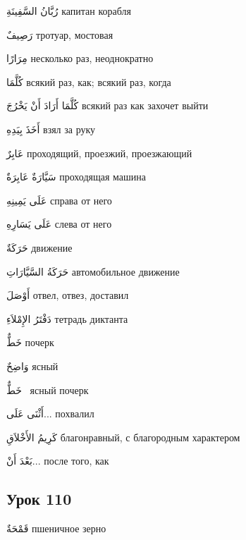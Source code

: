 \documentclass[a5paper]{article}
\newcommand\textstyleDropCaps[1]{#1}
\newcommand\textstyleCaptioncharacters[1]{#1}
\begin{document}
\textstyleCaptioncharacters{رُبَّانُ السَّفِينَةِ }\textstyleDropCaps{капитан корабля‎}

\textstyleCaptioncharacters{رَصِيفٌ }\textstyleDropCaps{тротуар, мостовая‎}

\textstyleCaptioncharacters{مِرَارًا }\textstyleDropCaps{несколько раз, неод­нократно‎}

\textstyleCaptioncharacters{كُلَّمَا }\textstyleDropCaps{всякий раз, как; вся­кий раз, когда‎}

\textstyleCaptioncharacters{كُلَّمَا أَرَادَ أَنْ يَخْرُجَ }\textstyleDropCaps{всякий раз как захочет выйти ‎}

\textstyleCaptioncharacters{أَخَذَ بِيَدِهِ }\textstyleDropCaps{взял за руку‎}

\textstyleCaptioncharacters{عَابِرٌ }\textstyleDropCaps{проходящий, проез­жий, проезжающий‎}

\textstyleCaptioncharacters{سَيَّارَةٌ عَابِرَةٌ }\textstyleDropCaps{проходя­щая машина‎}

\textstyleCaptioncharacters{عَلَى يَمِينِهِ }\textstyleDropCaps{справа от него‎}

\textstyleCaptioncharacters{عَلَى يَسَارِهِ }\textstyleDropCaps{слева от него‎}

\textstyleCaptioncharacters{حَرَكَةٌ }\textstyleDropCaps{движение‎}

\textstyleCaptioncharacters{حَرَكَةُ السَّيَّارَاتِ }\textstyleDropCaps{авто­мобильное движение‎}

\textstyleCaptioncharacters{أَوْصَلَ }\textstyleDropCaps{отвел, отвез, доста­вил‎}

\textstyleCaptioncharacters{دَفْتَرُ الإِمْلاَءِ }\textstyleDropCaps{тетрадь диктанта‎}

\textstyleCaptioncharacters{خَطٌّ }\textstyleDropCaps{почерк‎}

\textstyleCaptioncharacters{وَاضِحٌ }\textstyleDropCaps{ясный‎}

\textstyleCaptioncharacters{خَطٌّ \ }\textstyleDropCaps{ясный почерк‎}

\textstyleCaptioncharacters{أَثْنَى عَلَى... }\textstyleDropCaps{похвалил‎}

\textstyleCaptioncharacters{كَرِيمُ الأَخْلاَقِ }\textstyleDropCaps{благо­нравный, с благородным характером‎}

\textstyleCaptioncharacters{بَعْدَ أَنْ... }\textstyleDropCaps{после того, как‎}

\subsection[Урок 110‎]{\textstyleDropCaps{Урок 110‎}}
\textstyleCaptioncharacters{قَمْحَةٌ }\textstyleDropCaps{пшеничное зерно‎}
\end{document}
